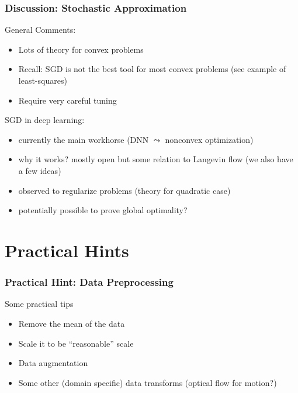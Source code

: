 \documentclass[12pt,fleqn,handout]{beamer}
\begin{document}
\begin{frame}[fragile]\frametitle{Discussion: Stochastic Approximation}

General Comments:
\begin{itemize}
\item 
Lots of theory for convex problems
\item
Recall: SGD is not the best tool for most convex problems (see example of least-squares)
\item
Require very careful tuning
\end{itemize}

\bigskip

SGD in deep learning:
\begin{itemize}
	\item currently the main workhorse (DNN $\leadsto$ nonconvex optimization)
	\item why it works? mostly open but some relation to Langevin flow (we also have a few ideas)
	\item observed to regularize problems (theory for quadratic case)
	\item potentially possible to prove global optimality?
\end{itemize}
\end{frame}


%

\section{Practical Hints}

\begin{frame}[fragile]\frametitle{Practical Hint: Data Preprocessing}

Some practical tips
\begin{itemize}
\item Remove the mean of the data
\item Scale it to be ``reasonable'' scale
\item Data augmentation
\item Some other (domain specific) data transforms (optical flow for motion?)
\end{itemize}

\end{frame}
\end{document}
